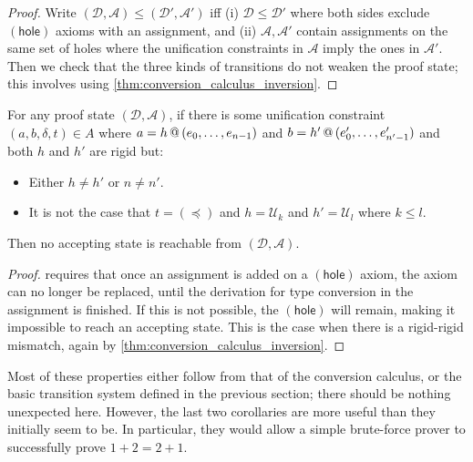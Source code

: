 \documentclass[twoside]{report}
\begin{document}
\begin{proof}
Write $(\mathcal D, \mathcal A) \leq (\mathcal D', \mathcal A')$ iff (i) $\mathcal D \leq \mathcal D'$ where both sides exclude $(\mathsf{hole})$ axioms with an assignment, and (ii) $\mathcal A, \mathcal A'$ contain assignments on the same set of holes where the unification constraints in $\mathcal A$ imply the ones in $\mathcal A'$. Then we check that the three kinds of transitions do not weaken the proof state; this involves using \cref{thm:conversion_calculus_inversion}.
\end{proof}

\begin{proposition}
\label{thm:tableau_states_unprovable_with_constraints}
For any proof state $(\mathcal D, \mathcal A)$, if there is some unification constraint $(a, b, \delta, t) \in A$ where $a = {h}\,@\,({e_0, \ldots, e_{n-1}})$ and $b = {h'}\,@\,({e'_0, \ldots, e'_{n'-1}})$ and both $h$ and $h'$ are rigid but:
\begin{itemize}[noitemsep]
    \item Either $h \neq h'$ or $n \neq n'$.
    \item It is not the case that $t = (\preceq)$ and $h = \mathcal U_k$ and $h' = \mathcal U_l$ where $k \leq l$.
\end{itemize}
Then no accepting state is reachable from $(\mathcal D, \mathcal A)$.
\end{proposition}

\begin{proof}
 requires that once an assignment is added on a $(\mathsf{hole})$ axiom, the axiom can no longer be replaced, until the derivation for type conversion in the assignment is finished. If this is not possible, the $(\mathsf{hole})$ will remain, making it impossible to reach an accepting state. This is the case when there is a rigid-rigid mismatch, again by \cref{thm:conversion_calculus_inversion}.
\end{proof}

Most of these properties either follow from that of the conversion calculus, or the basic transition system defined in the previous section; there should be nothing unexpected here. However, the last two corollaries are more useful than they initially seem to be. In particular, they would allow a simple brute-force prover to successfully prove $1 + 2 = 2 + 1$.
\end{document}
